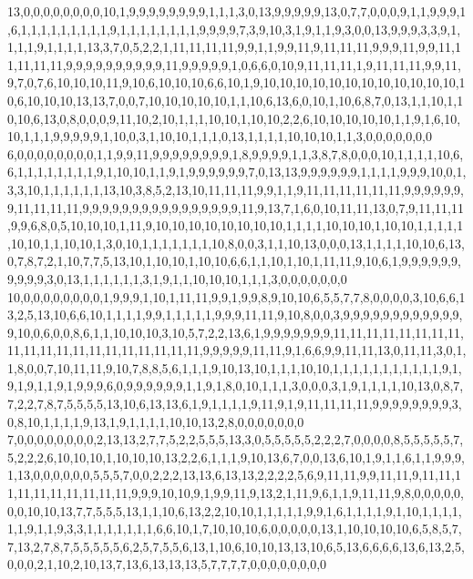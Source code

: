 13,0,0,0,0,0,0,0,0,10,1,9,9,9,9,9,9,9,9,1,1,1,3,0,13,9,9,9,9,9,13,0,7,7,0,0,0,9,1,1,9,9,9,1,6,1,1,1,1,1,1,1,1,1,9,1,1,1,1,1,1,1,1,9,9,9,9,7,3,9,10,3,1,9,1,1,9,3,0,0,13,9,9,9,3,3,9,1,1,1,1,9,1,1,1,1,13,3,7,0,5,2,2,1,11,11,11,11,9,9,1,1,9,9,11,9,11,11,11,9,9,9,11,9,9,11,11,11,11,11,9,9,9,9,9,9,9,9,9,9,11,9,9,9,9,9,1,0,6,6,0,10,9,11,11,11,1,9,11,11,11,9,9,11,9,7,0,7,6,10,10,10,11,9,10,6,10,10,10,6,6,10,1,9,10,10,10,10,10,10,10,10,10,10,10,10,10,6,10,10,10,13,13,7,0,0,7,10,10,10,10,10,1,1,10,6,13,6,0,10,1,10,6,8,7,0,13,1,1,10,1,10,10,6,13,0,8,0,0,0,9,11,10,2,10,1,1,1,10,10,1,10,10,2,2,6,10,10,10,10,10,1,1,9,1,6,10,10,1,1,1,9,9,9,9,9,1,10,0,3,1,10,10,1,1,1,0,13,1,1,1,1,10,10,10,1,1,3,0,0,0,0,0,0,0
6,0,0,0,0,0,0,0,0,1,1,9,9,11,9,9,9,9,9,9,9,9,1,8,9,9,9,9,1,1,3,8,7,8,0,0,0,10,1,1,1,1,10,6,6,1,1,1,1,1,1,1,1,9,1,10,10,1,1,9,1,9,9,9,9,9,9,7,0,13,13,9,9,9,9,9,9,1,1,1,1,9,9,9,10,0,1,3,3,10,1,1,1,1,1,1,13,10,3,8,5,2,13,10,11,11,11,9,9,1,1,9,11,11,11,11,11,11,9,9,9,9,9,9,9,11,11,11,11,9,9,9,9,9,9,9,9,9,9,9,9,9,9,9,9,11,9,13,7,1,6,0,10,11,11,13,0,7,9,11,11,11,9,9,6,8,0,5,10,10,10,1,11,9,10,10,10,10,10,10,10,10,1,1,1,1,10,10,10,1,10,10,1,1,1,1,1,10,10,1,1,10,10,1,3,0,10,1,1,1,1,1,1,1,10,8,0,0,3,1,1,10,13,0,0,0,13,1,1,1,1,10,10,6,13,0,7,8,7,2,1,10,7,7,5,13,10,1,10,10,1,10,10,6,6,1,1,10,1,10,1,11,11,9,10,6,1,9,9,9,9,9,9,9,9,9,9,3,0,13,1,1,1,1,1,1,3,1,9,1,1,10,10,10,1,1,1,3,0,0,0,0,0,0,0
10,0,0,0,0,0,0,0,0,1,9,9,9,1,10,1,11,11,9,9,1,9,9,8,9,10,10,6,5,5,7,7,8,0,0,0,0,3,10,6,6,13,2,5,13,10,6,6,10,1,1,1,1,9,9,1,1,1,1,1,9,9,9,11,11,9,10,8,0,0,3,9,9,9,9,9,9,9,9,9,9,9,9,9,10,0,6,0,0,8,6,1,1,10,10,10,3,10,5,7,2,2,13,6,1,9,9,9,9,9,9,9,11,11,11,11,11,11,11,11,11,11,11,11,11,11,11,11,11,11,11,11,9,9,9,9,9,11,11,9,1,6,6,9,9,11,11,13,0,11,11,3,0,1,1,8,0,0,7,10,11,11,9,10,7,8,8,5,6,1,1,1,9,10,13,10,1,1,1,10,10,1,1,1,1,1,1,1,1,1,1,1,9,1,9,1,9,1,1,9,1,9,9,9,6,0,9,9,9,9,9,9,1,1,9,1,8,0,10,1,1,1,3,0,0,0,3,1,9,1,1,1,1,10,13,0,8,7,7,2,2,7,8,7,5,5,5,5,13,10,6,13,13,6,1,9,1,1,1,1,9,11,9,1,9,11,11,11,11,9,9,9,9,9,9,9,9,3,0,8,10,1,1,1,1,9,13,1,9,1,1,1,1,10,10,13,2,8,0,0,0,0,0,0,0
7,0,0,0,0,0,0,0,0,2,13,13,2,7,7,5,2,2,5,5,5,13,3,0,5,5,5,5,5,2,2,2,7,0,0,0,0,8,5,5,5,5,5,7,5,2,2,2,6,10,10,10,1,10,10,10,13,2,2,6,1,1,1,9,10,13,6,7,0,0,13,6,10,1,9,1,1,6,1,1,9,9,9,1,13,0,0,0,0,0,0,5,5,5,7,0,0,2,2,2,13,13,6,13,13,2,2,2,2,5,6,9,11,11,9,9,11,11,9,11,11,11,11,11,11,11,11,11,11,9,9,9,10,10,9,1,9,9,11,9,13,2,1,11,9,6,1,1,9,11,11,9,8,0,0,0,0,0,0,0,10,10,13,7,7,5,5,5,13,1,1,10,6,13,2,2,10,10,1,1,1,1,1,9,9,1,6,1,1,1,1,9,1,10,1,1,1,1,1,1,9,1,1,9,3,3,1,1,1,1,1,1,1,6,6,10,1,7,10,10,10,6,0,0,0,0,0,13,1,10,10,10,10,6,5,8,5,7,7,13,2,7,8,7,5,5,5,5,5,6,2,5,7,5,5,6,13,1,10,6,10,10,13,13,10,6,5,13,6,6,6,6,13,6,13,2,5,0,0,0,2,1,10,2,10,13,7,13,6,13,13,13,5,7,7,7,7,0,0,0,0,0,0,0,0
